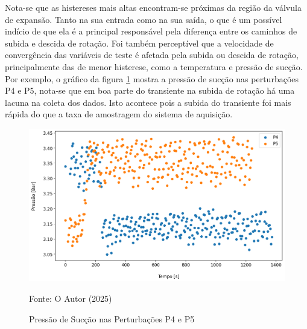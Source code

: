 Nota-se que as histereses mais altas encontram-se próximas da região da válvula de expansão. Tanto na sua entrada como na sua saída, o que é um possível indício de que ela é a principal responsável pela diferença entre os caminhos de subida e descida de rotação. Foi também perceptível que a velocidade de convergência das variáveis de teste é afetada pela subida ou descida de rotação, principalmente das de menor histerese, como a temperatura e pressão de sucção. Por exemplo, o gráfico da figura \ref{fig:PressãodeSucçãoSubidaeDescida} mostra a pressão de sucção nas perturbações P4 e P5, nota-se que em boa parte do transiente na subida de rotação há uma lacuna na coleta dos dados. Isto acontece pois a subida do transiente foi mais rápida do que a taxa de amostragem do sistema de aquisição.
\newpage
\begin{figure}[h]
    \centering
    \includegraphics[width=1\linewidth]{FigurasdoTexto/Pressão de sucção subida e descida.png}
    \caption{Pressão de Sucção nas Perturbações P4 e P5}
    \label{fig:PressãodeSucçãoSubidaeDescida}
    {\footnotesize Fonte: O Autor (2025)}
\end{figure}

